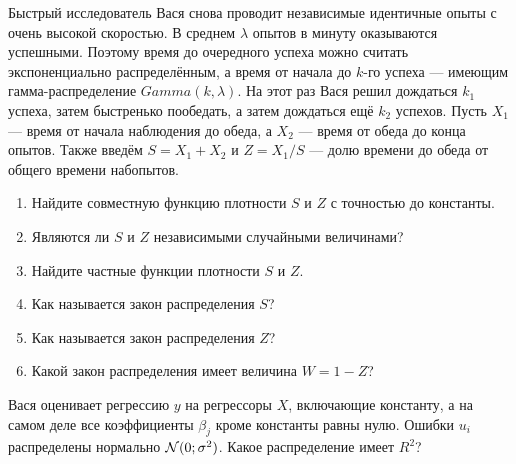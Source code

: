 \begin{problem}
    Быстрый исследователь Вася снова проводит независимые идентичные опыты с очень высокой скоростью. В среднем $\lambda$ опытов в минуту оказываются успешными. Поэтому время до очередного успеха можно считать экспоненциально распределённым, а время от начала до $k$-го успеха — имеющим гамма-распределение $Gamma(k, \lambda)$. На этот раз Вася решил дождаться $k_1$ успеха, затем быстренько пообедать, а затем дождаться ещё $k_2$ успехов. Пусть $X_1$ — время от начала наблюдения до обеда, а $X_2$ — время от обеда до конца опытов. Также введём $S=X_1 + X_2$ и $Z = X_1 / S$ — долю времени до обеда от общего времени набопытов.

\begin{enumerate}
    \item Найдите совместную функцию плотности $S$ и $Z$ с точностью до константы.
    \item Являются ли $S$ и $Z$ независимыми случайными величинами?
    \item Найдите частные функции плотности $S$ и $Z$.
    \item Как называется закон распределения $S$?
        \item Как называется закон распределения $Z$?
    \item Какой закон распределения имеет величина $W = 1 - Z$?
\end{enumerate}

\begin{sol}
\end{sol}
\end{problem}




\begin{problem}
    Вася оценивает регрессию $y$ на регрессоры $X$, включающие константу, 
    а на самом деле все коэффициенты $\beta_j$ кроме константы равны нулю. 
    Ошибки $u_i$ распределены нормально $\mathcal{N}(0;\sigma^2)$. Какое распределение имеет $R^2$?
\begin{sol}
\end{sol}
\end{problem}






\section{}

